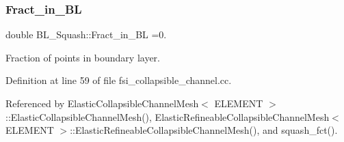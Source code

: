\mbox{\label{namespaceBL__Squash_af84bda39008884cd2b01e630957573df}} 
\subsubsection{\texorpdfstring{Fract\+\_\+in\+\_\+\+BL}{Fract\_in\_BL}}
{\footnotesize\ttfamily double B\+L\+\_\+\+Squash\+::\+Fract\+\_\+in\+\_\+\+BL =0.}



Fraction of points in boundary layer. 



Definition at line 59 of file fsi\+\_\+collapsible\+\_\+channel.\+cc.



Referenced by Elastic\+Collapsible\+Channel\+Mesh$<$ E\+L\+E\+M\+E\+N\+T $>$\+::\+Elastic\+Collapsible\+Channel\+Mesh(), Elastic\+Refineable\+Collapsible\+Channel\+Mesh$<$ E\+L\+E\+M\+E\+N\+T $>$\+::\+Elastic\+Refineable\+Collapsible\+Channel\+Mesh(), and squash\+\_\+fct().

